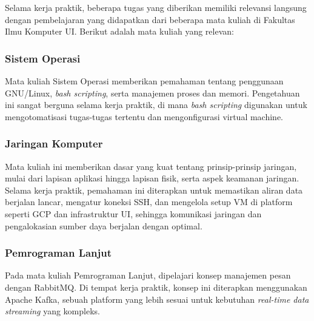 Selama kerja praktik, beberapa tugas yang diberikan memiliki relevansi langsung dengan pembelajaran yang didapatkan dari beberapa mata kuliah di Fakultas Ilmu Komputer UI. Berikut adalah mata kuliah yang relevan:

\subsubsection{Sistem Operasi}
Mata kuliah Sistem Operasi memberikan pemahaman tentang penggunaan GNU/Linux, \textit{bash scripting}, serta manajemen proses dan memori. Pengetahuan ini sangat berguna selama kerja praktik, di mana \textit{bash scripting} digunakan untuk mengotomatisasi tugas-tugas tertentu dan mengonfigurasi virtual machine.

\subsubsection{Jaringan Komputer}
Mata kuliah ini memberikan dasar yang kuat tentang prinsip-prinsip jaringan, mulai dari lapisan aplikasi hingga lapisan fisik, serta aspek keamanan jaringan. Selama kerja praktik, pemahaman ini diterapkan untuk memastikan aliran data berjalan lancar, mengatur koneksi SSH, dan mengelola setup VM di platform seperti GCP dan infrastruktur UI, sehingga komunikasi jaringan dan pengalokasian sumber daya berjalan dengan optimal.

\subsubsection{Pemrograman Lanjut}
Pada mata kuliah Pemrograman Lanjut, dipelajari konsep manajemen pesan dengan RabbitMQ. Di tempat kerja praktik, konsep ini diterapkan menggunakan Apache Kafka, sebuah platform yang lebih sesuai untuk kebutuhan \textit{real-time data streaming} yang kompleks.
